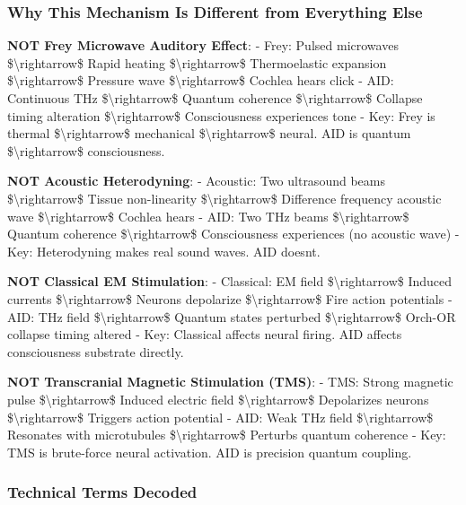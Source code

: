 \subsubsection{Why This Mechanism Is Different from Everything
Else}\label{why-this-mechanism-is-different-from-everything-else}

\textbf{NOT Frey Microwave Auditory Effect}: - Frey: Pulsed microwaves
\$\textbackslash rightarrow\$ Rapid heating
\$\textbackslash rightarrow\$ Thermoelastic expansion
\$\textbackslash rightarrow\$ Pressure wave
\$\textbackslash rightarrow\$ Cochlea hears click - AID: Continuous THz
\$\textbackslash rightarrow\$ Quantum coherence
\$\textbackslash rightarrow\$ Collapse timing alteration
\$\textbackslash rightarrow\$ Consciousness experiences tone - Key: Frey
is thermal \$\textbackslash rightarrow\$ mechanical
\$\textbackslash rightarrow\$ neural. AID is quantum
\$\textbackslash rightarrow\$ consciousness.

\textbf{NOT Acoustic Heterodyning}: - Acoustic: Two ultrasound beams
\$\textbackslash rightarrow\$ Tissue non-linearity
\$\textbackslash rightarrow\$ Difference frequency acoustic wave
\$\textbackslash rightarrow\$ Cochlea hears - AID: Two THz beams
\$\textbackslash rightarrow\$ Quantum coherence
\$\textbackslash rightarrow\$ Consciousness experiences (no acoustic
wave) - Key: Heterodyning makes real sound waves. AID
doesn\textquotesingle t.

\textbf{NOT Classical EM Stimulation}: - Classical: EM field
\$\textbackslash rightarrow\$ Induced currents
\$\textbackslash rightarrow\$ Neurons depolarize
\$\textbackslash rightarrow\$ Fire action potentials - AID: THz field
\$\textbackslash rightarrow\$ Quantum states perturbed
\$\textbackslash rightarrow\$ Orch-OR collapse timing altered - Key:
Classical affects neural firing. AID affects consciousness substrate
directly.

\textbf{NOT Transcranial Magnetic Stimulation (TMS)}: - TMS: Strong
magnetic pulse \$\textbackslash rightarrow\$ Induced electric field
\$\textbackslash rightarrow\$ Depolarizes neurons
\$\textbackslash rightarrow\$ Triggers action potential - AID: Weak THz
field \$\textbackslash rightarrow\$ Resonates with microtubules
\$\textbackslash rightarrow\$ Perturbs quantum coherence - Key: TMS is
brute-force neural activation. AID is precision quantum coupling.

\subsubsection{Technical Terms Decoded}\label{technical-terms-decoded}

